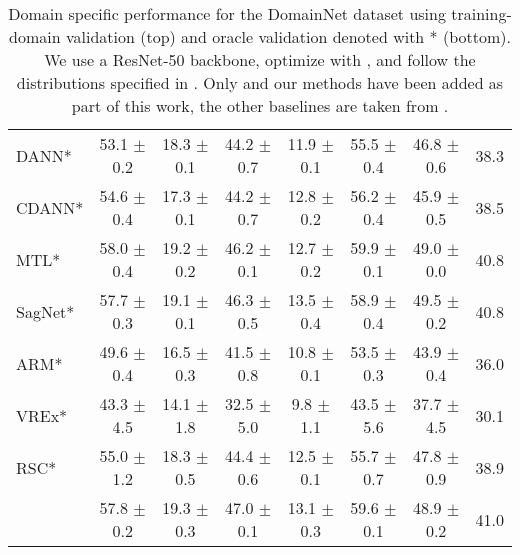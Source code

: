 \begin{table*}
\begin{center}
\begin{tabular}{lccccccc}
DANN*                 & 53.1 $\pm$ 0.2       & 18.3 $\pm$ 0.1       & 44.2 $\pm$ 0.7       & 11.9 $\pm$ 0.1       & 55.5 $\pm$ 0.4       & 46.8 $\pm$ 0.6       & 38.3                 \\
CDANN*                & 54.6 $\pm$ 0.4       & 17.3 $\pm$ 0.1       & 44.2 $\pm$ 0.7       & 12.8 $\pm$ 0.2       & 56.2 $\pm$ 0.4       & 45.9 $\pm$ 0.5       & 38.5                 \\
MTL*                  & 58.0 $\pm$ 0.4       & 19.2 $\pm$ 0.2       & 46.2 $\pm$ 0.1       & 12.7 $\pm$ 0.2       & 59.9 $\pm$ 0.1       & 49.0 $\pm$ 0.0       & 40.8                 \\
SagNet*               & 57.7 $\pm$ 0.3       & 19.1 $\pm$ 0.1       & 46.3 $\pm$ 0.5       & 13.5 $\pm$ 0.4       & 58.9 $\pm$ 0.4       & 49.5 $\pm$ 0.2       & 40.8                 \\
ARM*                  & 49.6 $\pm$ 0.4       & 16.5 $\pm$ 0.3       & 41.5 $\pm$ 0.8       & 10.8 $\pm$ 0.1       & 53.5 $\pm$ 0.3       & 43.9 $\pm$ 0.4       & 36.0                 \\
VREx*                 & 43.3 $\pm$ 4.5       & 14.1 $\pm$ 1.8       & 32.5 $\pm$ 5.0       & 9.8 $\pm$ 1.1        & 43.5 $\pm$ 5.6       & 37.7 $\pm$ 4.5       & 30.1                 \\
RSC*                  & 55.0 $\pm$ 1.2       & 18.3 $\pm$ 0.5       & 44.4 $\pm$ 0.6       & 12.5 $\pm$ 0.1       & 55.7 $\pm$ 0.7       & 47.8 $\pm$ 0.9       & 38.9                \\
\tdivcams 	           & 57.8 $\pm$ 0.2       & 19.3 $\pm$ 0.3        & 47.0 $\pm$ 0.1       & 13.1 $\pm$ 0.3      & 59.6 $\pm$ 0.1	     & 48.9 $\pm$ 0.2       & 41.0                 \\
\bottomrule
\end{tabular}
\caption[Domain specific performance for the DomainNet dataset]{Domain specific performance for the DomainNet dataset using training-domain validation (top) and  oracle validation denoted with * (bottom). We use a ResNet-50 backbone, optimize with \adam, and follow the distributions specified in \domainbed. Only \rsc and our methods have been added as part of this work, the other baselines are taken from \domainbed.}
\end{center}
\end{table*}